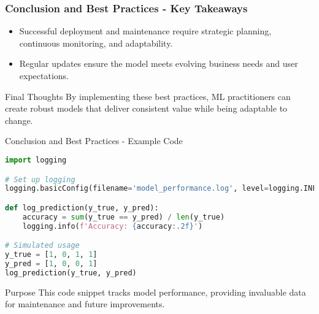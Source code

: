 \documentclass[aspectratio=169]{beamer}
\begin{document}
\begin{frame}[fragile]
    \frametitle{Conclusion and Best Practices - Key Takeaways}
    \begin{itemize}
        \item Successful deployment and maintenance require strategic planning, continuous monitoring, and adaptability.
        \item Regular updates ensure the model meets evolving business needs and user expectations.
    \end{itemize}
    \begin{block}{Final Thoughts}
        By implementing these best practices, ML practitioners can create robust models that deliver consistent value while being adaptable to change.
    \end{block}
\end{frame}

\begin{frame}{Conclusion and Best Practices - Example Code}
    \begin{lstlisting}[language=Python]
import logging

# Set up logging
logging.basicConfig(filename='model_performance.log', level=logging.INFO)

def log_prediction(y_true, y_pred):
    accuracy = sum(y_true == y_pred) / len(y_true)
    logging.info(f'Accuracy: {accuracy:.2f}')

# Simulated usage
y_true = [1, 0, 1, 1]
y_pred = [1, 0, 0, 1]
log_prediction(y_true, y_pred)
    \end{lstlisting}
    \begin{block}{Purpose}
        This code snippet tracks model performance, providing invaluable data for maintenance and future improvements.
    \end{block}
\end{frame}
\end{document}
